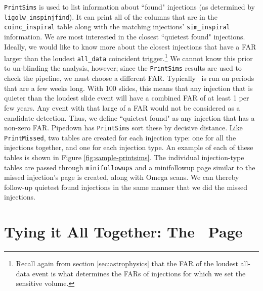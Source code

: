 \texttt{PrintSims} is used to list information about ``found" injections (as determined
by \verb|ligolw_inspinjfind|). It can print all of the columns that are in the
\verb|coinc_inspiral| table along with the matching injections'
\verb|sim_inspiral| information. We are most interested in the closest
``quietest found" injections. Ideally, we would like to know more about the
closest injections that have a \ac{FAR} larger than the loudest \verb|all_data|
coincident trigger.\footnote{Recall again from section \ref{sec:astrophysics}
that the \ac{FAR} of the loudest all-data event is what determines the
\acp{FAR} of injections for which we set the sensitive volume.} We cannot know
this prior to un-blinding the analysis, however; since the \texttt{PrintSims} results are
used to check the pipeline, we must choose a different \ac{FAR}. Typically
\ihope~is run on periods that are a few weeks long. With 100 slides, this means
that any injection that is quieter than the loudest slide event will have a
combined \ac{FAR} of at least 1 per few years. Any event with that large of a
\ac{FAR} would not be considered as a candidate detection. Thus, we define
``quietest found" as any injection that has a non-zero \ac{FAR}. Pipedown has
\texttt{PrintSims} sort these by decisive distance. Like \texttt{PrintMissed}, two tables are
created for each injection type: one for all the injections together, and one
for each injection type. An example of each of these tables is shown in Figure
\ref{fig:sample-printsims}. The individual injection-type tables are passed
through \verb|minifollowups| and a minifollowup page similar to the missed
injection's page is created, along with Omega scans. We can thereby follow-up
quietest found injections in the same manner that we did the missed injections.

\section{Tying it All Together: The \ihope~Page}
\label{sec:ihope_page}

